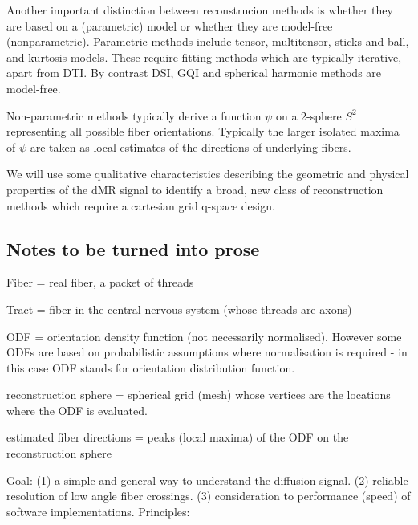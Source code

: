 \documentclass{bioinfo}
\begin{document}
Another important distinction between reconstrucion methods is whether
they are based on a (parametric) model or whether they are model-free
(nonparametric). Parametric methods include tensor, multitensor,
sticks-and-ball, and kurtosis models. These require fitting methods
which are typically iterative, apart from DTI. By contrast DSI, GQI and
spherical harmonic methods are model-free.

Non-parametric methods typically derive a function $\psi$ on a 2-sphere
$S^2$ representing all possible fiber orientations. Typically the larger
isolated maxima of $\psi$ are taken as local estimates of the directions of
underlying fibers.

We will use some qualitative characteristics describing the geometric
and physical properties of the dMR signal to identify a broad, new class
of reconstruction methods which require a cartesian grid q-space design.

\subsection{Notes to be turned into prose}


Fiber = real fiber, a packet of threads

Tract = fiber in the central nervous system (whose threads are axons)

ODF = orientation density function (not necessarily normalised). However
some ODFs are based on probabilistic assumptions where normalisation is
required - in this case ODF stands for orientation distribution function.

reconstruction sphere = spherical grid (mesh) whose vertices are the
locations where the ODF is evaluated.

estimated fiber directions = peaks (local maxima) of the ODF on the
reconstruction sphere

Goal: (1) a simple and general way to understand the diffusion
signal. (2) reliable resolution of low angle fiber crossings. (3)
consideration to performance (speed) of software implementations.
Principles:
\end{document}
